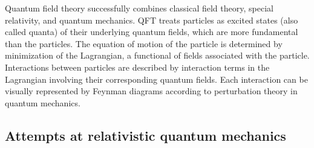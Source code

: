Quantum field theory successfully combines classical field theory, special relativity, and quantum mechanics. QFT treats particles as excited states (also called quanta) of their underlying quantum fields, which are more fundamental than the particles. The equation of motion of the particle is determined by minimization of the Lagrangian, a functional of fields associated with the particle. Interactions between particles are described by interaction terms in the Lagrangian involving their corresponding quantum fields. Each interaction can be visually represented by Feynman diagrams according to perturbation theory in quantum mechanics.

\subsection{Attempts at relativistic quantum mechanics}
\label{sec:attempts-rqt}

